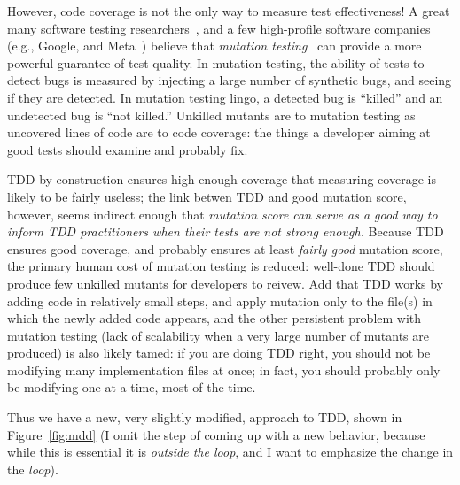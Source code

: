 \documentclass[sigplan,screen]{acmart}
\begin{document}
However, code coverage is not the
only way to measure test effectiveness!  A great many software testing
researchers~\cite{JustMut,CleanCode,Discontents,MutationSurvey}, and a few high-profile software companies (e.g., Google,
and Meta~\cite{PetrovicMutationGoogle,BellerFacebookMutation}) believe that \emph{mutation testing}~\cite{demillo1978hints,budd1979mutation} can provide a more
powerful guarantee of test quality.  In mutation testing, the ability
of tests to detect bugs is measured by injecting a large number of
synthetic bugs, and seeing if they are detected.  In mutation
testing lingo, a detected bug is ``killed'' and an undetected bug is
``not killed.''  Unkilled mutants are to mutation testing as uncovered
lines of code are to code coverage:  the things a developer aiming at
good tests should examine and probably fix.

TDD by construction ensures high enough coverage that
measuring coverage is likely to be fairly useless; the link betwen TDD
and good mutation score, however, seems indirect enough that
\emph{mutation score can serve as a good way to inform TDD
  practitioners when their tests are not strong enough.}   Because TDD
ensures good coverage, and probably ensures at least \emph{fairly
  good} mutation score, the primary human cost of mutation testing is
reduced:  well-done TDD should produce few unkilled mutants for
developers to reivew.  Add that TDD works by adding code in relatively
small steps, and apply mutation only to the file(s) in which the newly
added code appears, and the other persistent problem with mutation testing (lack of
scalability when a very large number of mutants are produced) is also
likely tamed: if you are doing TDD right, you should not be modifying
many implementation files at once; in fact, you should probably only
be modifying one at a time, most of the time.

Thus we have a new, very slightly modified, approach to TDD, shown in
Figure~\ref{fig:mdd} (I omit the step of coming up with a new
behavior, because while this is essential it is \emph{outside the
  loop}, and I want to emphasize the change in the \emph{loop}).
\end{document}
